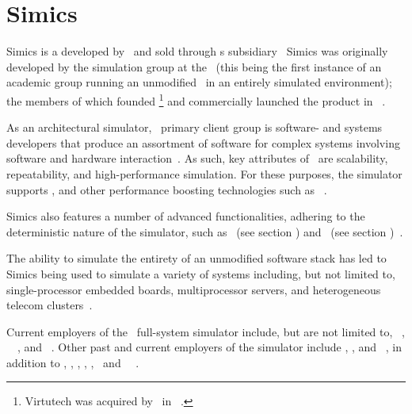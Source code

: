 
\chapter{Simics}
\label{cha:simics}
Simics is a  developed by \dvttermintel\ and sold through \dvttermintel s subsidiary \dvttermwindriver\
Simics was originally developed by the simulation group at the \dvttermsics\ (this being the first instance of an academic group running an unmodified \dvttermos\ in an entirely simulated environment); the members of which founded \dvttermvirtutech \footnote{Virtutech was acquired by \dvttermintel\ in ~.} and commercially launched the product in ~.

As an architectural simulator, \dvttermsimics\ primary client group is software- and systems developers that produce an assortment of software for complex systems involving software and hardware interaction~.
As such, key attributes of \dvttermsimics\ are scalability, repeatability, and high-performance simulation.
For these purposes, the simulator supports \dvttermhostvirtualizationextensions , and other performance boosting technologies such as \dvttermhypersimulation ~.

Simics also features a number of advanced functionalities, adhering to the deterministic nature of the simulator, such as \dvttermcheckpointing\ (see section ) and \dvttermreverseexecution\ (see section )~.

The ability to simulate the entirety of an unmodified software stack has led to Simics being used to simulate a variety of systems including, but not limited to, single-processor embedded boards, multiprocessor servers, and heterogeneous telecom clusters~.

Current employers of the \dvttermsimics\ full-system simulator include, but are not limited to, \dvttermibm ~, \dvttermnasa ~~, and \dvttermintel ~.
Other past and current employers of the simulator include \dvttermsunmicrosystems , \dvttermericsson , and \dvttermhewlettpackard ~\dvtcmdcitebib{journals:magnusson:2013}, in addition to \dvttermcisco , \dvttermfreescalesemiconductor , \dvttermgeavionics , \dvttermhoneywell , \dvttermlockheedmartin , \dvttermnortel\ and \dvttermnorthropgrumman\ ~.

